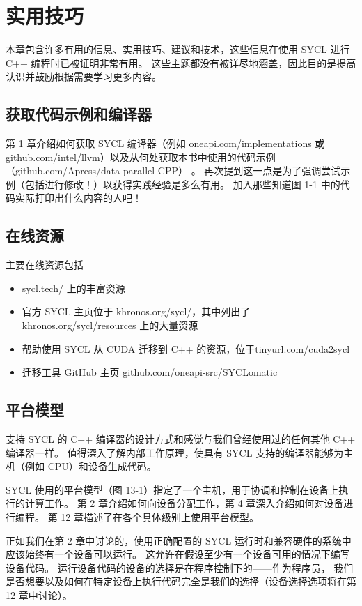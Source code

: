 \section{实用技巧}
本章包含许多有用的信息、实用技巧、建议和技术，这些信息在使用 SYCL 进行 C++ 编程时已被证明非常有用。 
这些主题都没有被详尽地涵盖，因此目的是提高认识并鼓励根据需要学习更多内容。

\subsection{获取代码示例和编译器}
第 1 章介绍如何获取 SYCL 编译器（例如 oneapi.com/implementations 
或 github.com/intel/llvm）以及从何处获取本书中使用的代码示例（github.com/Apress/data-parallel-CPP） 。 
再次提到这一点是为了强调尝试示例（包括进行修改！）以获得实践经验是多么有用。 
加入那些知道图 1-1 中的代码实际打印出什么内容的人吧！

\subsection{在线资源}
主要在线资源包括

\begin{itemize}
	\item sycl.tech/ 上的丰富资源

	\item 官方 SYCL 主页位于 khronos.org/sycl/，其中列出了 khronos.org/sycl/resources 上的大量资源

	\item 帮助使用 SYCL 从 CUDA 迁移到 C++ 的资源，位于tinyurl.com/cuda2sycl

	\item 迁移工具 GitHub 主页 github.com/oneapi-src/SYCLomatic
\end{itemize}

\subsection{平台模型}
支持 SYCL 的 C++ 编译器的设计方式和感觉与我们曾经使用过的任何其他 C++ 编译器一样。 
值得深入了解内部工作原理，使具有 SYCL 支持的编译器能够为主机（例如 CPU）和设备生成代码。

SYCL 使用的平台模型（图 13-1）指定了一个主机，用于协调和控制在设备上执行的计算工作。 
第 2 章介绍如何向设备分配工作，第 4 章深入介绍如何对设备进行编程。 第 12 章描述了在各个具体级别上使用平台模型。

正如我们在第 2 章中讨论的，使用正确配置的 SYCL 运行时和兼容硬件的系统中应该始终有一个设备可以运行。 
这允许在假设至少有一个设备可用的情况下编写设备代码。 
运行设备代码的设备的选择是在程序控制下的——作为程序员，
我们是否想要以及如何在特定设备上执行代码完全是我们的选择（设备选择选项将在第 12 章中讨论）。

